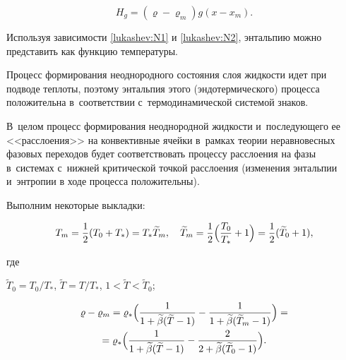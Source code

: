 \begin{equation}

H_g= (\varrho-\varrho_m )g (x-x_m).

\label{lukashev:N5}

\end{equation}

Используя зависимости \eqref{lukashev:N1} и \eqref{lukashev:N2}, энтальпию можно представить как функцию температуры. 

Процесс формирования неоднородного состояния слоя жидкости идет при подводе теплоты, поэтому энтальпия этого (эндотермического) процесса положительна в~соответствии с~термодинамической системой знаков. 

В~целом процесс формирования неоднородной жидкости и~последующего ее <<расслоения>> на конвективные ячейки в~рамках теории неравновесных фазовых переходов будет соответствовать процессу расслоения на фазы в~системах с~нижней критической точкой расслоения (изменения энтальпии и~энтропии в ходе процесса положительны).



Выполним некоторые выкладки:

\begin{equation}

T_m=\frac12 (T_0+T_*)=T_* \widetilde{T}_m, 

\quad 

\widetilde{T}_m=\frac12\Bigl(\frac{T_0}{T_*}+1\Bigr)=

\frac12(\widetilde{T}_0+1), \label{lukashev:*7}

\end{equation}

где 

$\widetilde{T}_0=T_0/T_*$, $\widetilde{T}=T/T_*$, $1<\widetilde{T}<\widetilde{T}_0$;

\begin{multline}

\varrho-\varrho_m=\varrho_*\Bigl(\frac1{1+\widetilde{\beta}(\widetilde{T}-1)}-

\frac1{1+\widetilde{\beta}(\widetilde{T}_m-1)}\Bigr)=\\

\label{lukashev:N6} 

=\varrho_*\Bigl(

\frac1{1+\widetilde{\beta}(\widetilde{T}-1)}-

\frac2{2+\widetilde{\beta}(\widetilde{T}_0-1)}\Bigr).

\end{multline}

